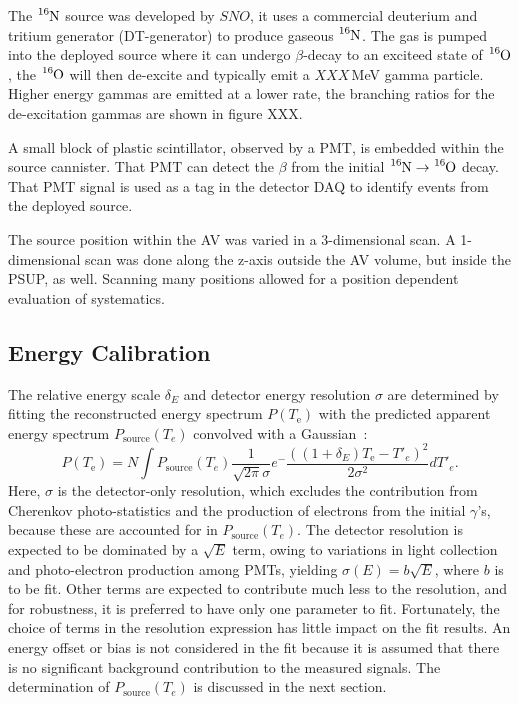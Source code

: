 The $\ce{^{16}N}$ source was developed by $SNO$, it uses a commercial
deuterium and tritium generator (DT-generator) to produce gaseous $\ce{^{16}N}$.
The gas is pumped into the deployed source where it can undergo $\beta$-decay
to an exciteed state of $\ce{^{16}O}$, the $\ce{^{16}O}$ will then de-excite
and typically emit a $XXX$\,MeV gamma particle. Higher energy gammas are emitted
at a lower rate, the branching ratios for the de-excitation gammas are shown in
figure XXX.

A small block of plastic scintillator, observed by a PMT, is embedded within the
source cannister. That PMT can detect the $\beta$ from the initial
$\ce{^{16}N} \rightarrow \ce{^{16}O}$ decay. That PMT signal is used as a
tag in the detector DAQ to identify events from the deployed source.

The source position within the AV was varied in a 3-dimensional
scan.
A 1-dimensional scan was done along the z-axis outside the AV volume,
but inside the PSUP, as well.
Scanning many positions allowed for a position dependent evaluation of
systematics.

\subsection{Energy Calibration}

The relative energy scale $\delta_E$ and detector energy resolution $\sigma$
are determined by fitting the reconstructed energy spectrum $P(T_\mathrm{e})$
with the predicted apparent energy spectrum $P_\mathrm{source}(T_e)$ convolved
with a Gaussian~\cite{Dunford:2006qb}:
\begin{equation}
  P(T_\mathrm{e}) = N \int P_\mathrm{source}(T_e)\frac{1}{\sqrt{2\pi}\sigma}e^-{\frac{((1+\delta_E)T_\mathrm{e}-T\prime_{e})^2}{2\sigma^2}}dT\prime_{e}.%
\label{eq:convolution}
\end{equation}
Here, $\sigma$ is the detector-only resolution, which excludes the contribution
from Cherenkov photo-statistics and the production of electrons from the initial
$\gamma$'s, because these are accounted for in $P_\mathrm{source}(T_e)$.  The
detector resolution is expected to be dominated by a $\sqrt{E}$ term, owing to
variations in light collection and photo-electron production among PMTs,
yielding $\sigma(E) = b\sqrt{E}$, where $b$ is to be fit.  Other terms are
expected to contribute much less to the resolution, and for robustness, it is
preferred to have only one parameter to fit.  Fortunately, the choice of terms
in the resolution expression has little impact on the fit results.  An energy
offset or bias is not considered in the fit because
it is assumed that there is no significant background contribution to the
measured signals.  The determination of $P_\mathrm{source}(T_{e})$ is discussed in
the next section.




